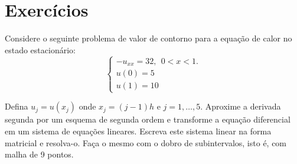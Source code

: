 \section*{Exercícios}

\begin{Exercise}
 Considere o seguinte problema de valor de contorno para a equação de calor no estado estacionário:
$$\left\{\begin{array}{l}-u_{xx}=32,~~ 0<x<1.\\
u(0)=5\\
u(1)=10\end{array}
\right.
$$

Defina $u_j=u(x_j)$ onde $x_j={(j-1)}{h}$ e $j=1,\ldots,5$. Aproxime a derivada segunda por um esquema de segunda ordem e transforme a equação diferencial em um sistema de equações lineares. Escreva este sistema linear na forma matricial e resolva-o. Faça o mesmo com o dobro de subintervalos, isto é, com malha de 9 pontos. 
\end{Exercise}

